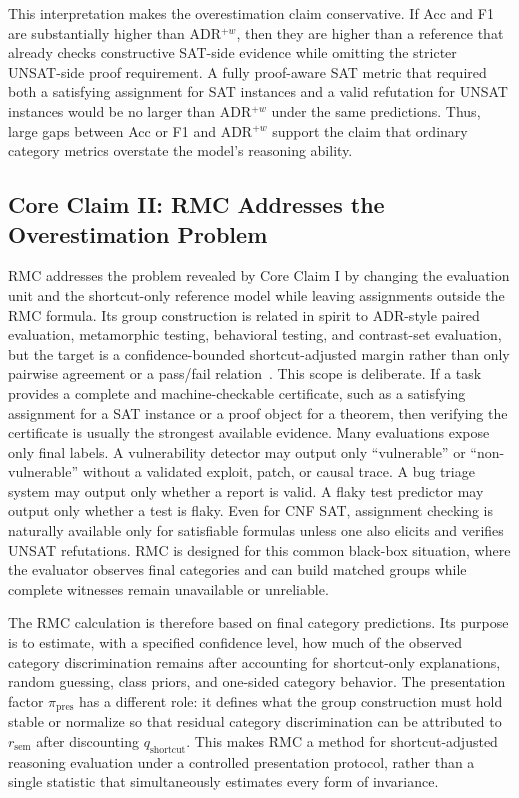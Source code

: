 \documentclass[conference]{IEEEtran}
\theoremstyle{remark}
\newcommand{\reasonFac}{r_{\mathrm{sem}}}
\newcommand{\shortcutFac}{q_{\mathrm{shortcut}}}
\newcommand{\presentationFac}{\pi_{\mathrm{pres}}}
\begin{document}
This interpretation makes the overestimation claim conservative.  If Acc and F1 are substantially higher than ADR$^{+w}$, then they are higher than a reference that already checks constructive SAT-side evidence while omitting the stricter UNSAT-side proof requirement.  A fully proof-aware SAT metric that required both a satisfying assignment for SAT instances and a valid refutation for UNSAT instances would be no larger than ADR$^{+w}$ under the same predictions.  Thus, large gaps between Acc or F1 and ADR$^{+w}$ support the claim that ordinary category metrics overstate the model's reasoning ability.

\subsection{Core Claim II: RMC Addresses the Overestimation Problem}
\label{sec:rmc-target-setup}

RMC addresses the problem revealed by Core Claim I by changing the evaluation unit and the shortcut-only reference model while leaving assignments outside the RMC formula.  Its group construction is related in spirit to ADR-style paired evaluation, metamorphic testing, behavioral testing, and contrast-set evaluation, but the target is a confidence-bounded shortcut-adjusted margin rather than only pairwise agreement or a pass/fail relation~\cite{chen2020metamorphic,barr2015oracle,ribeiro2020checklist,gardner2020contrast}.  This scope is deliberate.  If a task provides a complete and machine-checkable certificate, such as a satisfying assignment for a SAT instance or a proof object for a theorem, then verifying the certificate is usually the strongest available evidence.  Many evaluations expose only final labels.  A vulnerability detector may output only ``vulnerable'' or ``non-vulnerable'' without a validated exploit, patch, or causal trace.  A bug triage system may output only whether a report is valid.  A flaky test predictor may output only whether a test is flaky.  Even for CNF SAT, assignment checking is naturally available only for satisfiable formulas unless one also elicits and verifies UNSAT refutations.  RMC is designed for this common black-box situation, where the evaluator observes final categories and can build matched groups while complete witnesses remain unavailable or unreliable.

The RMC calculation is therefore based on final category predictions.  Its purpose is to estimate, with a specified confidence level, how much of the observed category discrimination remains after accounting for shortcut-only explanations, random guessing, class priors, and one-sided category behavior.  The presentation factor $\presentationFac$ has a different role: it defines what the group construction must hold stable or normalize so that residual category discrimination can be attributed to $\reasonFac$ after discounting $\shortcutFac$.  This makes RMC a method for shortcut-adjusted reasoning evaluation under a controlled presentation protocol, rather than a single statistic that simultaneously estimates every form of invariance.
\end{document}
